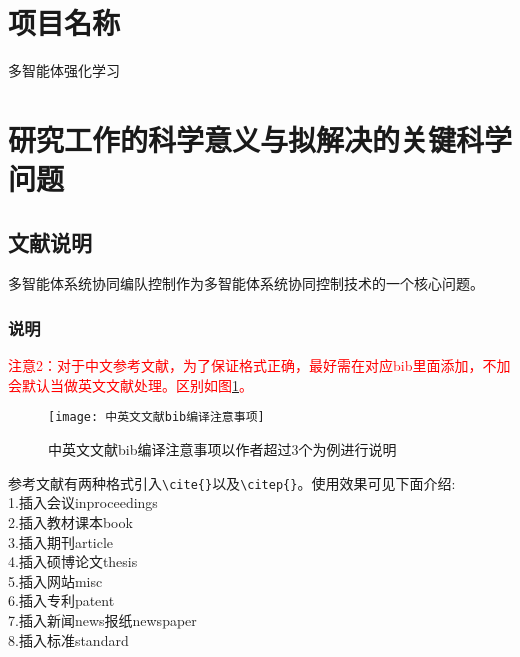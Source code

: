 \documentclass{wreport}
\begin{document}
\section{项目名称}%
多智能体强化学习


\section{研究工作的科学意义与拟解决的关键科学问题}%



\subsection{文献说明}
多智能体系统协同编队控制作为多智能体系统协同控制技术的一个核心问题。
\subsubsection{说明}

\textcolor{red}{注意2：对于中文参考文献，为了保证格式正确，最好需在对应bib里面添加，不加会默认当做英文文献处理。区别如图\ref{fig_bib0}。}

\begin{figure}[!htb]
  \centering
  \texttt{[image: 中英文文献bib编译注意事项]}
  \caption{中英文文献bib编译注意事项以作者超过3个为例进行说明}
  \label{fig_bib0}
\end{figure}

参考文献有两种格式引入\verb+\cite{}+以及\verb+\citep{}+。使用效果可见下面介绍:\\
1.插入会议inproceedings\cite{zhao2015bearing0}\\
2.插入教材课本book\cite{williams1991probability,chengzhaolin2006,zhangsan2007}\\
3.插入期刊article\cite{cao2011formation,xue2015formation}\\
4.插入硕博论文thesis\cite{lisi2015,wangwu2015,deans2005bearings}\\
5.插入网站misc\cite{irdawebsite,h7n9,wikipedia_moores_law}\\
6.插入专利patent\cite{xiao2012yi,p6915001}\\
7.插入新闻news报纸newspaper\cite{zhang2000,renminribao}\\
8.插入标准standard\cite{gbt3469-1983}
\end{document}
